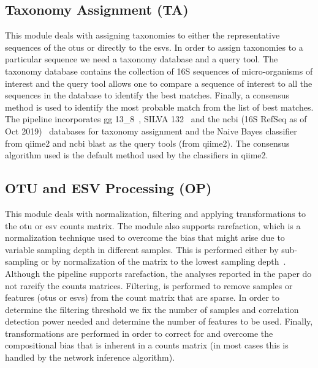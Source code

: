   \subsection*{Taxonomy Assignment (TA)}
  \vspace{-5mm}
  This module deals with assigning taxonomies to either the representative sequences of the \ac{otu}s or directly to the \ac{esv}s.
  In order to assign taxonomies to a particular sequence we need a taxonomy database and a query tool.
  The taxonomy database contains the collection of 16S sequences of micro-organisms of interest and the query tool allows one to compare a sequence of interest to all the sequences in the database to identify the best matches.
  Finally, a consensus method is used to identify the most probable match from the list of best matches.
  The pipeline incorporates \ac{gg} 13\_8~\cite{DeSantis2006}, SILVA 132~\cite{Quast2012} and the \ac{ncbi} (16S RefSeq as of Oct 2019)~\cite{Sayers2009} databases for taxonomy assignment and the Naive Bayes classifier from \ac{qiime2} and \ac{ncbi} blast as the query tools (from \ac{qiime2}).
  The consensus algorithm used is the default method used by the classifiers in \ac{qiime2}.

  \subsection*{OTU and ESV Processing (OP)}
  \vspace{-5mm}
  This module deals with normalization, filtering and applying transformations to the \ac{otu} or \ac{esv} counts matrix.
  The module also supports rarefaction, which is a normalization technique used to overcome the bias that might arise due to variable sampling depth in different samples.
  This is performed either by sub-sampling or by normalization of the matrix to the lowest sampling depth~\cite{Weiss2015}.
  Although the pipeline supports rarefaction, the analyses reported in the paper do not rareify the counts matrices.
  Filtering, is performed to remove samples or features (\ac{otu}s or \ac{esv}s) from the count matrix that are sparse.
  In order to determine the filtering threshold we fix the number of samples and correlation detection power needed and determine the number of features to be used.
  Finally, transformations are performed in order to correct for and overcome the compositional bias that is inherent in a counts matrix (in most cases this is handled by the network inference algorithm).

